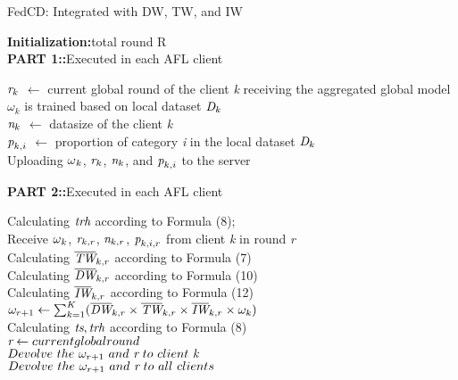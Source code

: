 \documentclass[twoside,twocolumn]{article}
\begin{document}
\begin{algorithm}\small
\caption{FedCD: Integrated with DW, TW, and IW} 
\textbf{Initialization:}total round R\\
\textbf{PART 1::}Executed in each AFL client

\begin{algorithmic}[1]
	\STATE $\emph{r}_{k}$ $\leftarrow$ current global round of the client \emph{k} receiving the aggregated global model\\
	\STATE $\omega_{k}$ is trained based on local dataset $\emph{D}_k$\\
	\STATE $\emph{n}_k$ $\leftarrow $ datasize of the client \emph{k}\\
	\STATE $\emph{p}_{k,i}$ $\leftarrow$ proportion of category \emph{i} in the local dataset $\emph{D}_k$\\
\ENDFOR
\STATE Uploading $\emph{$\omega$}_k$, $\emph{r}_k$, $\emph{n}_k$, and $\emph{p}_{k,i}$  to the server
\end{algorithmic} 
%
\textbf{PART 2::}Executed in each AFL client

\begin{algorithmic}[1]
\STATE Calculating $\emph{trh}$ according to Formula (8);\\
	\STATE Receive $\emph{$\omega$}_k$, $\emph{r}_{k,r}$, $\emph{n}_{k,r}$, $\emph{p}_{k,i,r}$  from client \emph{k} in round \emph{r}\\
	\STATE Calculating $\overline{\emph{TW}}_{k,r}$ according to Formula (7)\\
	\STATE Calculating $\overline{\emph{DW}}_{k,r}$ according to Formula (10)\\
	\STATE Calculating $\overline{\emph{IW}}_{k,r}$ according to Formula (12)\\
	\STATE $\omega_{r+1} \leftarrow \sum_{k=1}^{K}(\overline{\emph{DW}}_{k,r} \times \overline{\emph{TW}}_{k,r} \times \overline{\emph{IW}}_{k,r} \times \omega_{k})$\\
	\STATE Calculating $\emph{ts}, \emph{trh}$ according to Formula (8)\\
	\STATE $\emph{r} \leftarrow current global round$\\
		\STATE $Devolve\ the\ \omega_{r+1}\ and\ \emph{r}\ to\ client\ \emph{k}$\\
	\ELSE
		\STATE $Devolve\ the\ \omega_{r+1}\ and\ \emph{r}\ to\ all\ clients$
	\ENDIF
\ENDFOR
\end{algorithmic} 
\end{algorithm}
%
\end{document}
